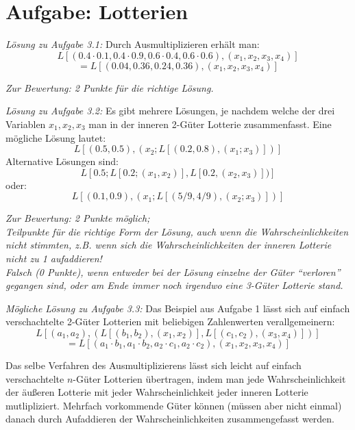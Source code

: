 \documentclass[10pt, a4paper, german]{article}
\numberwithin {equation}{section}
\begin{document}
\section{Aufgabe: Lotterien}

{\em Lösung zu Aufgabe 3.1:} Durch Ausmultiplizieren erhält man:
\[
L[(0.4\cdot 0.1, 0.4 \cdot 0.9, 0.6\cdot 0.4, 0.6\cdot 0.6), (x_1, x_2,
x_3, x_4)]
\]
\[
= L[(0.04, 0.36, 0.24, 0.36), (x_1, x_2, x_3, x_4)]
\]

\vspace{0.25cm}

{\em Zur Bewertung: 2 Punkte für die richtige Lösung.}


\vspace{0.5cm}

{\em Lösung zu Aufgabe 3.2:} Es gibt mehrere Lösungen, je nachdem welche der
drei Variablen $x_1, x_2, x_3$ man in der inneren 2-Güter Lotterie zusammenfasst.
Eine mögliche Lösung lautet:
\[
L[(0.5, 0.5), (x_2; L[(0.2, 0.8),(x_1; x_3)])]
\]
Alternative Lösungen sind:
\[
L[0.5; L[0.2; (x_1, x_2)], L[0.2,(x_2, x_3)])]
\]
oder:
\[
L[(0.1, 0.9), (x_1; L[(5/9, 4/9),(x_2; x_3)])]
\]

\vspace{0.25cm}

{\em Zur Bewertung: 2 Punkte möglich; \\
Teilpunkte für die richtige Form der Lösung, auch wenn die Wahrscheinlichkeiten
nicht stimmten, z.B. wenn sich die Wahrscheinlichkeiten der inneren Lotterie
nicht zu 1 aufaddieren!\\
Falsch (0 Punkte), wenn entweder bei der Lösung einzelne der Güter ``verloren''
gegangen sind, oder am Ende immer noch irgendwo eine 3-Güter Lotterie stand.}


\vspace{0.5cm}

{\em Mögliche Lösung zu Aufgabe 3.3:} Das Beispiel aus Aufgabe 1 lässt sich auf
einfach verschachtelte 2-Güter Lotterien mit beliebigen Zahlenwerten
verallgemeinern:
\[
L[(a_1, a_2), (L[(b_1, b_2),(x_1, x_2)], L[(c_1, c_2),(x_3, x_4)])]
\]
\[
= L[(a_1\cdot b_1, a_1\cdot b_2, a_2\cdot c_1, a_2\cdot c_2),(x_1, x_2, x_3,
x_4)]
\]

Das selbe Verfahren des Ausmultiplizierens lässt sich leicht auf einfach
verschachtelte $n$-Güter Lotterien übertragen, indem man jede Wahrscheinlichkeit
der äußeren Lotterie mit jeder Wahrscheinlichkeit jeder inneren Lotterie
mutlipliziert. Mehrfach vorkommende Güter können (müssen aber nicht einmal)
danach durch Aufaddieren der Wahrscheinlichkeiten zusammengefasst werden.
\end{document}
